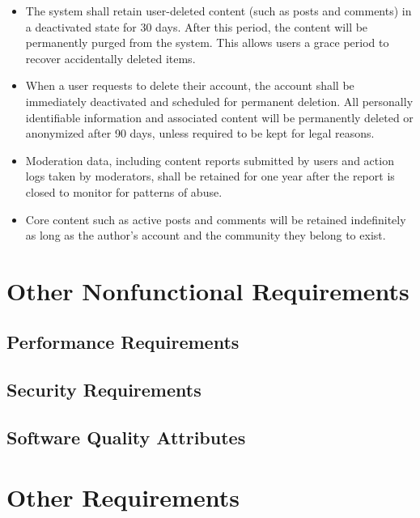 \documentclass{scrreprt}
\begin{document}
\begin{itemize}[leftmargin=2cm]

    \item[\textbf{DI-1:}] The system shall retain user-deleted content (such as posts and comments) in a deactivated state for 30 days. After this period, the content will be permanently purged from the system. This allows users a grace period to recover accidentally deleted items.

    \item[\textbf{DI-2:}] When a user requests to delete their account, the account shall be immediately deactivated and scheduled for permanent deletion. All personally identifiable information and associated content will be permanently deleted or anonymized after 90 days, unless required to be kept for legal reasons.

    \item[\textbf{DI-3:}] Moderation data, including content reports submitted by users and action logs taken by moderators, shall be retained for one year after the report is closed to monitor for patterns of abuse.

    \item[\textbf{DI-4:}] Core content such as active posts and comments will be retained indefinitely as long as the author's account and the community they belong to exist.

\end{itemize}

\chapter{Other Nonfunctional Requirements}

\section{Performance Requirements}

\section{Security Requirements}

\section{Software Quality Attributes}

\chapter{Other Requirements}
\end{document}

